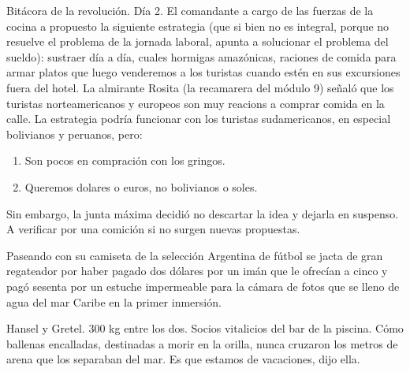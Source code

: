 \documentclass[11pt,twoside,openright,a6paper]{book}
\begin{document}
\vspace{0.5cm}
\hrulefill\hspace{0.2cm} \decofourleft\decofourright \hspace{0.2cm} \hrulefill
\vspace{0.5cm}

Bitácora de la revolución. Día 2. El comandante a cargo de las fuerzas de
la cocina a propuesto la siguiente estrategia (que si bien no es integral,
porque no resuelve el problema de la jornada laboral, apunta a solucionar
el problema del sueldo): sustraer día a día, cuales hormigas amazónicas,
raciones de comida para armar platos que luego venderemos a los turistas
cuando estén en sus excursiones fuera del hotel. La almirante Rosita
(la recamarera del módulo 9) señaló que los turistas norteamericanos
y europeos son muy reacions a comprar comida en la calle. La estrategia
podría funcionar con los turistas sudamericanos, en especial bolivianos
y peruanos, pero:

\begin{enumerate}
\item Son pocos en compración con los gringos.
\item Queremos dolares o euros, no bolivianos o soles.
\end{enumerate}

Sin embargo, la junta máxima decidió no descartar la idea y dejarla en
suspenso. A verificar por una comición si no surgen nuevas propuestas.


\vspace{0.5cm}
\hrulefill\hspace{0.2cm} \decofourleft\decofourright \hspace{0.2cm} \hrulefill
\vspace{0.5cm}

Paseando con su camiseta de la selección Argentina de fútbol se jacta de
gran regateador por haber pagado dos dólares por un imán que le ofrecían
a cinco y pagó sesenta por un estuche impermeable para la cámara de fotos
que se lleno de agua del mar Caribe en la primer inmersión.


\vspace{0.5cm}
\hrulefill\hspace{0.2cm} \decofourleft\decofourright \hspace{0.2cm} \hrulefill
\vspace{0.5cm}

Hansel y Gretel. 300 kg entre los dos. Socios vitalicios del bar de la
piscina. Cómo ballenas encalladas, destinadas a morir en la orilla, nunca
cruzaron los metros de arena que los separaban del mar. Es que estamos de
vacaciones, dijo ella.
\end{document}

